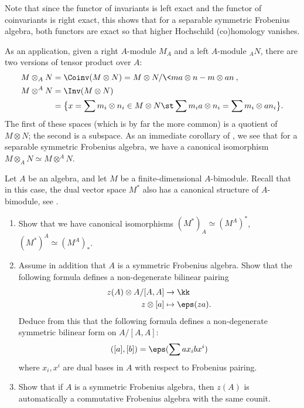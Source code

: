 Note that since the functor of invariants is left exact and the functor of
coinvariants is right exact, this shows that for a separable symmetric Frobenius
algebra, both functors are exact so that higher Hochschild (co)homology vanishes.


As an application, given a right $A$-module $M_A$ and a left $A$-module
${}_A N$, there are two versions of tensor product over $A$:
\begin{equation}\label{e:tensor-types}
  \begin{aligned}
    M\otimes_A N &= \Coinv (M\otimes N) =
    M \otimes N/\<ma\otimes n- m\otimes an\>,\\
    M\otimes^A N &=\Inv(M\otimes N) \\
    &=\bigl\{x=\sum m_i\otimes n_i\in M\otimes N
    \st \sum m_ia\otimes n_i=\sum m_i\otimes an_i\bigr\}.
  \end{aligned}
\end{equation}
The first of these spaces (which is by far the more common) is a quotient of
$M\otimes N$; the second is a subspace. As an immediate corollary of
, we see that for a separable symmetric Frobenius
algebra, we have a canonical isomorphism $M \otimes_A N \simeq M\otimes^A
N$.


\begin{exercise}\label{ec:invariants-dual}
  Let $A$ be an algebra, and let $M$ be a finite-dimensional $A$-bimodule.
  Recall that in this case, the dual vector space $M^*$ also has a canonical
  structure of $A$-bimodule, see .
  \begin{enumerate}
    \item Show that we have canonical isomorphisms
      $(M^*)_A\simeq (M^A)^*$, $(M^*)^A\simeq (M^A)_*$.
    \item Assume in addition that $A$ is a symmetric Frobenius algebra.
      Show that the following formula defines a non-degenerate bilinear
      pairing
        \begin{align*}
          z(A)\otimes A/[A,A]&\to \kk\\
           z\otimes [a]&\mapsto \eps(za).
        \end{align*}
        Deduce from this that the following formula defines a non-degenerate
        symmetric bilinear form on $A/[A,A]$:
        $$
        ([a],[b])=\eps(\sum ax_ibx^i)
        $$
        where $x_i, x^i$ are dual bases in $A$ with respect to Frobenius
        pairing.
    \item Show that if $A$ is a  symmetric Frobenius algebra, then $z(A)$ is
      automatically  a commutative Frobenius algebra with the same counit.
  \end{enumerate}
\end{exercise}

